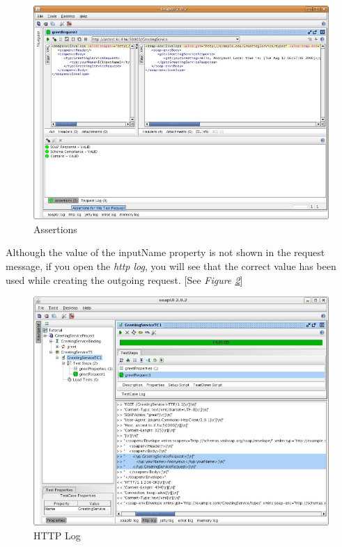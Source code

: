 \documentclass{article}
\begin{document}
\begin{figure}[!hbp]
\begin{center}
\includegraphics{fig/ARC1PythonDGDraft-img16_resize.jpg}
\caption{Assertions}
\label{fig:evalres}
\end{center}
\end{figure}

Although the value of the inputName property is not shown in the request
message, if you open the \textit{http log}, you will see that the
correct value has been used while creating the outgoing
request. [See \emph{Figure \ref{fig:httplog}}]

\begin{figure}
\begin{center}
\includegraphics{fig/ARC1PythonDGDraft-img17_resize.jpg}
\caption{HTTP Log}
\label{fig:httplog}
\end{center}
\end{figure}
\end{document}
